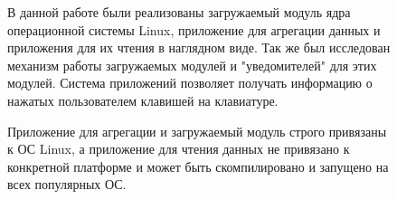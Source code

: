 \Conclusion %

\begin{figure}
В данной работе были реализованы загружаемый модуль ядра операционной системы Linux, приложение для агрегации данных и приложения для их чтения в наглядном виде. Так же был исследован механизм работы загружаемых модулей и "уведомителей" для этих модулей.
Система приложений позволяет получать информацию о нажатых пользователем клавишей на клавиатуре. 

Приложение для агрегации и загружаемый модуль строго привязаны к ОС Linux, а приложение для чтения данных не привязано к конкретной платформе и может быть скомпилировано и запущено на всех популярных ОС.
\end{figure}
